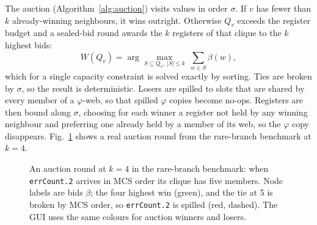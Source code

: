\documentclass[conference]{IEEEtran}
\newcommand{\tm}[1]{\texttt{#1}}
\begin{document}
The auction (Algorithm~\ref{alg:auction}) visits values in order
$\sigma$. If $v$ has fewer than $k$ already-winning neighbours, it wins
outright. Otherwise $Q_v$ exceeds the register budget and a sealed-bid
round awards the $k$ registers of that clique to the $k$ highest bids:
\begin{equation}
W(Q_v) = \arg\max_{S\subseteq Q_v,\ |S|\le k}\ \sum_{w\in S}\beta(w),
\label{eq:auction}
\end{equation}
which for a single capacity constraint is solved exactly by sorting.
Ties are broken by $\sigma$, so the result is deterministic. Losers are
spilled to slots that are shared by every member of a $\varphi$-web,
so that spilled $\varphi$ copies become no-ops. Registers are then bound
along $\sigma$, choosing for each winner a register not held by any
winning neighbour and preferring one already held by a member of its
web, so the $\varphi$ copy disappears. Fig.~\ref{fig:auction} shows a
real auction round from the rare-branch benchmark at $k=4$.

\begin{figure}[t]
\centering
{}
\caption{An auction round at $k=4$ in the rare-branch benchmark:
when \tm{errCount.2} arrives in MCS order its clique has five members.
Node labels are bids $\beta$; the four highest win (green), and the tie
at 5 is broken by MCS order, so \tm{errCount.2} is spilled (red, dashed).
The GUI uses the same colours for auction winners and losers.}
\label{fig:auction}
\end{figure}
\end{document}
